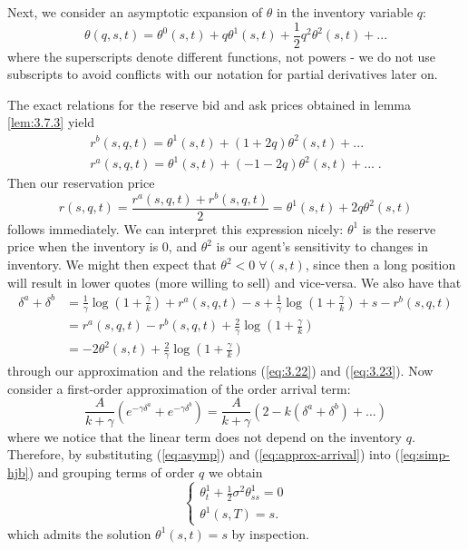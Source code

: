 Next, we consider an asymptotic expansion of $\theta$ in the inventory variable $q$:
\begin{equation}\label{eq:asymp}
    \theta(q,s,t)=\theta^0(s,t)+q\theta^1(s,t)+\frac{1}{2}q^2\theta^2(s,t)+...
\end{equation}
where the superscripts denote different functions, not powers - we do not use subscripts
to avoid conflicts with our notation for partial derivatives later on.

The exact relations for the reserve bid and ask prices obtained in lemma \ref{lem:3.7.3}
yield
\begin{gather}
    r^b(s,q,t)=\theta^1(s,t)+(1+2q)\theta^2(s,t)+...\\
    r^a(s,q,t)=\theta^1(s,t)+(-1-2q)\theta^2(s,t)+...\;.
\end{gather}
Then our reservation price
\begin{equation}\label{eq:reserve-price}
    r(s,q,t)=\frac{r^a(s,q,t)+r^b(s,q,t)}{2}=\theta^1(s,t)+2q\theta^2(s,t)
\end{equation}
follows immediately. We can interpret this expression nicely: $\theta^1$ is the reserve
price when the inventory is 0, and $\theta^2$ is our agent's sensitivity to changes in 
inventory. We might then expect that $\theta^2 < 0\;\forall(s,t)$, since then a long 
position will result in lower quotes (more willing to sell) and vice-versa. We also 
have that
\begin{equation}\label{eq:spread}
    \begin{aligned}
        \delta^a+\delta^b&=\frac{1}{\gamma}\log\left(1+\frac{\gamma}{k}\right)+r^a(s,q,t)-s+\frac{1}{\gamma}\log\left(1+\frac{\gamma}{k}\right)+s-r^b(s,q,t)\\
        &=r^a(s,q,t)-r^b(s,q,t)+\frac{2}{\gamma}\log\left(1+\frac{\gamma}{k}\right)\\
        &=-2\theta^2(s,t)+\frac{2}{\gamma}\log\left(1+\frac{\gamma}{k}\right)
    \end{aligned}
\end{equation}
through our approximation and the relations (\ref{eq:3.22}) and (\ref{eq:3.23}).
Now consider a first-order approximation of the order arrival term:
\begin{equation}\label{eq:approx-arrival}
    \frac{A}{k+\gamma}(e^{-\gamma\delta^a}+e^{-\gamma\delta^b})=\frac{A}{k+\gamma}(2-k(\delta^a+\delta^b)+...)
\end{equation}
where we notice that the linear term does not depend on the inventory $q$. Therefore,
by substituting (\ref{eq:asymp}) and (\ref{eq:approx-arrival}) into (\ref{eq:simp-hjb}) 
and grouping terms of order $q$ we obtain
\begin{equation}\label{eq:3.32}
    \begin{cases} 
        \theta^1_t+\frac{1}{2}\sigma^2\theta^1_{ss}=0\\
        \theta^1(s,T)=s.
    \end{cases}
\end{equation}
which admits the solution $\theta^1(s,t)=s$ by inspection. 

